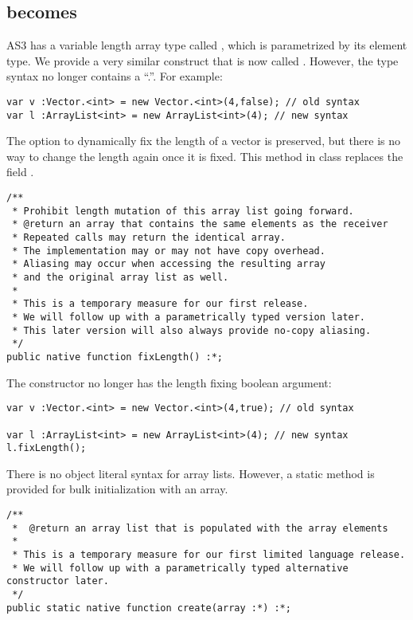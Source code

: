 \subsection{ becomes }
\label{vector}
AS3 has a variable length array type called , which is
parametrized by its element type. We provide a very similar construct that is
now called . However, the type syntax no longer contains a
``.''. For example:
\begin{verbatim}
var v :Vector.<int> = new Vector.<int>(4,false); // old syntax
var l :ArrayList<int> = new ArrayList<int>(4); // new syntax
\end{verbatim}

The option to dynamically fix the length of a vector is preserved, but there is
no way to change the length again once it is fixed.
This method in class  replaces the field .
\begin{verbatim}
/**
 * Prohibit length mutation of this array list going forward.
 * @return an array that contains the same elements as the receiver
 * Repeated calls may return the identical array.
 * The implementation may or may not have copy overhead.
 * Aliasing may occur when accessing the resulting array
 * and the original array list as well.
 *
 * This is a temporary measure for our first release.
 * We will follow up with a parametrically typed version later.
 * This later version will also always provide no-copy aliasing.
 */
public native function fixLength() :*;
\end{verbatim}

The constructor no longer has the length fixing boolean argument:
\begin{verbatim}
var v :Vector.<int> = new Vector.<int>(4,true); // old syntax

var l :ArrayList<int> = new ArrayList<int>(4); // new syntax
l.fixLength();
\end{verbatim}

There is no object literal syntax for array lists. However, a static method is
provided for bulk initialization with an array.
\begin{verbatim}
/**
 *  @return an array list that is populated with the array elements
 *
 * This is a temporary measure for our first limited language release.
 * We will follow up with a parametrically typed alternative constructor later.
 */
public static native function create(array :*) :*;
\end{verbatim}

